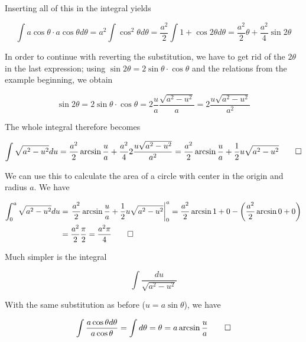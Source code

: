 Inserting all of this in the integral yields

\begin{equation*}
    \int a \cos \theta \cdot a \cos \theta d\theta = a^2 \int \cos^2 \theta d\theta = \frac{a^2}{2} \int 1 + \cos 2 \theta d\theta = \frac{a^2}{2} \theta + \frac{a^2}{4} \sin 2 \theta
\end{equation*}

In order to continue with reverting the substitution, we have to get rid of the $2 \theta$ in the last expression; using $\sin 2 \theta = 2 \sin \theta \cdot \cos \theta$ and the relations from the example beginning, we obtain

\begin{equation*}
    \sin 2 \theta = 2 \sin \theta \cdot \cos \theta = 2 \frac{u}{a} \frac{\sqrt{a^2 - u^2}}{a} = 2 \frac{u \sqrt{a^2 - u^2}}{a^2}
\end{equation*}

The whole integral therefore becomes

\begin{equation*}
    \int \sqrt{a^2 - u^2} du = \frac{a^2}{2} \arcsin \frac{u}{a} + \frac{a^2}{4} 2 \frac{u \sqrt{a^2 - u^2}}{a^2}  = \frac{a^2}{2} \arcsin \frac{u}{a} + \frac{1}{2} u \sqrt{a^2 - u^2} \qed
\end{equation*}

We can use this to calculate the area of a circle with center in the origin and radius $a$. We have

\begin{align*}
    \int_0^a \sqrt{a^2 - u^2} du &= \left. \frac{a^2}{2} \arcsin \frac{u}{a} + \frac{1}{2} u \sqrt{a^2 - u^2} \right|_0^a = \frac{a^2}{2} \arcsin 1 + 0 - \left( \frac{a^2}{2} \arcsin 0 + 0 \right) \\ &= \frac{a^2}{2} \frac{\pi}{2} = \frac{a^2 \pi}{4} \qed
\end{align*}

Much simpler is the integral

\begin{equation*}
    \int \frac{du}{\sqrt{a^2 - u^2}}
\end{equation*}

With the same substitution as before ($u = a \sin \theta$), we have

\begin{equation*}
    \int \frac{a \cos \theta d \theta}{a \cos \theta} = \int d\theta = \theta = a \arcsin \frac{u}{a} \qed
\end{equation*}

